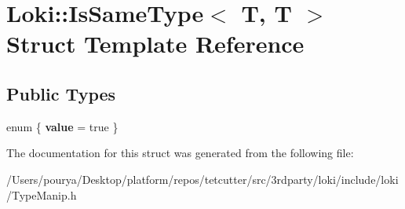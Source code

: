 \hypertarget{structLoki_1_1IsSameType_3_01T_00_01T_01_4}{}\section{Loki\+:\+:Is\+Same\+Type$<$ T, T $>$ Struct Template Reference}
\label{structLoki_1_1IsSameType_3_01T_00_01T_01_4}
\subsection*{Public Types}
\begin{DoxyCompactItemize}
\item 
\hypertarget{structLoki_1_1IsSameType_3_01T_00_01T_01_4_a5800f9469445eee8ca29952f6dbc163f}{}enum \{ {\bfseries value} = true
 \}\label{structLoki_1_1IsSameType_3_01T_00_01T_01_4_a5800f9469445eee8ca29952f6dbc163f}

\end{DoxyCompactItemize}


The documentation for this struct was generated from the following file\+:\begin{DoxyCompactItemize}
\item 
/\+Users/pourya/\+Desktop/platform/repos/tetcutter/src/3rdparty/loki/include/loki/Type\+Manip.\+h\end{DoxyCompactItemize}
